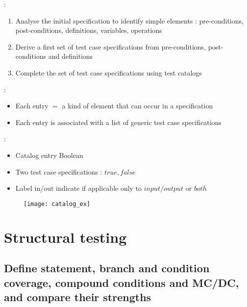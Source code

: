  :
\begin{enumerate}
    \item Analyse the initial specification to identify simple
elements : pre-conditions, post-conditions, definitions,
variables, operations
    \item Derive a first set of test case specifications from pre-conditions, post-conditions
and definitions
    \item Complete the set of test case specifications using test catalogs
\end{enumerate}


 :

\begin{itemize}
    \item Each entry $=$ a kind of element that can occur in a specification
    \item Each entry is associated with a list of generic test case specifications
\end{itemize}

 :

\begin{itemize}
    \item Catalog entry Boolean
    \item Two test case specifications : $true, false$
    \item Label in/out indicate if applicable only to $input/output$ or $both$
\end{itemize}

\begin{figure}[H]
    \centering
    \texttt{[image: catalog\_ex]}
\end{figure}

\chapter{Structural testing}

\section{Define statement, branch and condition coverage, compound conditions and MC/DC, and compare their strengths}

